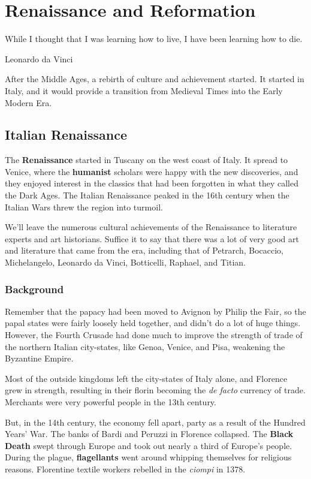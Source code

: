 \chapter{Renaissance and Reformation}

\epigraph{%
  While I thought that I was learning how to live, I have been learning how to die.
}{Leonardo da Vinci}

After the Middle Ages, a rebirth of culture and achievement started.
It started in Italy, and it would provide a transition from Medieval Times into the Early Modern Era.

\section{Italian Renaissance}

The \textbf{Renaissance} started in Tuscany on the west coast of Italy.
It spread to Venice, where the \textbf{humanist} scholars were happy with the new discoveries,
and they enjoyed interest in the classics that had been forgotten in what they called the Dark Ages.
The Italian Renaissance peaked in the 16th century when the Italian Wars threw the region into turmoil.

We'll leave the numerous cultural achievements of the Renaissance to literature experts and art historians.
Suffice it to say that there was a lot of very good art and literature that came from the era,
including that of Petrarch, Bocaccio, Michelangelo, Leonardo da Vinci, Botticelli, Raphael, and Titian.

\subsection*{Background}

Remember that the papacy had been moved to Avignon by Philip the Fair,
so the papal states were fairly loosely held together, and didn't do a lot of huge things.
However, the Fourth Crusade had done much to improve the strength of trade of the northern Italian city-states,
like Genoa, Venice, and Pisa, weakening the Byzantine Empire.

Most of the outside kingdoms left the city-states of Italy alone,
and Florence grew in strength, resulting in their florin becoming the \textit{de facto} currency of trade.
Merchants were very powerful people in the 13th century.

But, in the 14th century, the economy fell apart, party as a result of the Hundred Years' War.
The banks of Bardi and Peruzzi in Florence collapsed.
The \textbf{Black Death} swept through Europe and took out nearly a third of Europe's people.
During the plague, \textbf{flagellants} went around whipping themselves for religious reasons.
Florentine textile workers rebelled in the \textit{ciompi} in 1378.

